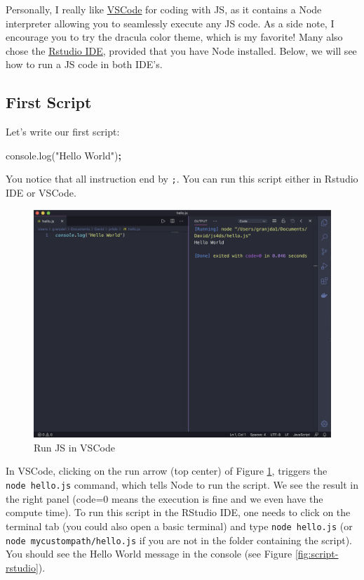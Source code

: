 \documentclass[]{book}
\newenvironment{Shaded}{\begin{snugshade}}{\end{snugshade}}
\newcommand{\AttributeTok}[1]{\textcolor[rgb]{0.77,0.63,0.00}{#1}}
\newcommand{\NormalTok}[1]{#1}
\newcommand{\OperatorTok}[1]{\textcolor[rgb]{0.81,0.36,0.00}{\textbf{#1}}}
\newcommand{\StringTok}[1]{\textcolor[rgb]{0.31,0.60,0.02}{#1}}
\newcommand{\VariableTok}[1]{\textcolor[rgb]{0.00,0.00,0.00}{#1}}
\begin{document}
Personally, I really like \href{https://code.visualstudio.com}{VSCode} for coding with JS, as it contains a Node interpreter allowing you to seamlessly execute any JS code. As a side note, I encourage you to try the dracula color theme, which is my favorite! Many also chose the \href{https://rstudio.com/products/rstudio/}{Rstudio IDE}, provided that you have Node installed. Below, we will see how to run a JS code in both IDE's.

\hypertarget{first-script}{%
\subsection{First Script}\label{first-script}}

Let's write our first script:

\begin{Shaded}
\begin{Highlighting}[]
\VariableTok{console}\NormalTok{.}\AttributeTok{log}\NormalTok{(}\StringTok{"Hello World"}\NormalTok{)}\OperatorTok{;}
\end{Highlighting}
\end{Shaded}

You notice that all instruction end by \texttt{;}. You can run this script either in Rstudio IDE or VSCode.

\begin{figure}
\includegraphics[width=29.61in]{images/survival-kit/script-vscode} \caption{Run JS in VSCode}\label{fig:script-vscode}
\end{figure}

In VSCode, clicking on the run arrow (top center) of Figure \ref{fig:script-vscode}, triggers the \texttt{node\ hello.js} command, which tells Node to run the script. We see the result in the right panel (code=0 means the execution is fine and we even have the compute time). To run this script in the RStudio IDE, one needs to click on the terminal tab (you could also open a basic terminal) and type \texttt{node\ hello.js} (or \texttt{node\ mycustompath/hello.js} if you are not in the folder containing the script). You should see the Hello World message in the console (see Figure \ref{fig:script-rstudio}).
\end{document}
